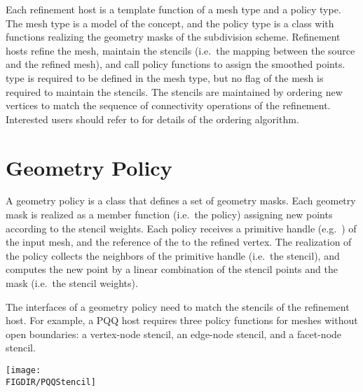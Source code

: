 
Each refinement host is a template function of
a mesh type and a policy type. The mesh type is
a model of the  concept, and the
policy type is a class with functions realizing the 
geometry masks of the subdivision scheme.
Refinement hosts refine the mesh, maintain the stencils 
(i.e.~the mapping between the source and the refined mesh), 
and call policy functions
to assign the smoothed points.  type is required
to be defined in the mesh type, but no flag of the mesh 
is required to maintain the stencils. The stencils are maintained
by ordering new vertices to match the sequence of connectivity 
operations of the refinement. Interested users should 
refer to \cite{cgal:sp-mrbee-05} for details of the 
ordering algorithm.

\section{Geometry Policy}
A geometry policy is a class that defines a set of geometry masks. 
Each geometry mask is realized as a member function (i.e.~the policy) 
assigning new points according to the stencil weights.
Each policy receives a primitive handle 
(e.g.~) of the input mesh, and the reference of 
the  to the refined vertex. The realization of the policy
collects the neighbors of the primitive handle (i.e.~the stencil),
and computes the new point by a linear combination of the stencil 
points and the mask (i.e.~the stencil weights).

The interfaces of a geometry policy need to match the stencils of 
the refinement host. For example, a PQQ host requires three 
policy functions for meshes without open boundaries: a vertex-node 
stencil, an edge-node stencil, and a facet-node stencil. 

\begin{ccTexOnly}
  \begin{center}
    \parbox{0.5\textwidth}{%
      \texttt{[image: \\FIGDIR/PQQStencil]}%
    }
  \end{center}
\end{ccTexOnly}


